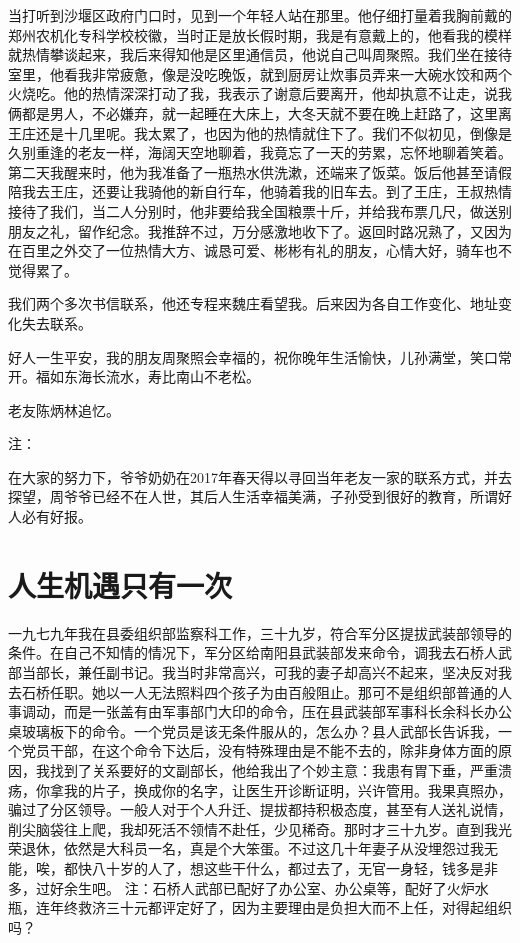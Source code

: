 当打听到沙堰区政府门口时，见到一个年轻人站在那里。他仔细打量着我胸前戴的郑州农机化专科学校校徽，当时正是放长假时期，我是有意戴上的，他看我的模样就热情攀谈起来，我后来得知他是区里通信员，他说自己叫周聚照。我们坐在接待室里，他看我非常疲惫，像是没吃晚饭，就到厨房让炊事员弄来一大碗水饺和两个火烧吃。他的热情深深打动了我，我表示了谢意后要离开，他却执意不让走，说我俩都是男人，不必嫌弃，就一起睡在大床上，大冬天就不要在晚上赶路了，这里离王庄还是十几里呢。我太累了，也因为他的热情就住下了。我们不似初见，倒像是久别重逢的老友一样，海阔天空地聊着，我竟忘了一天的劳累，忘怀地聊着笑着。第二天我醒来时，他为我准备了一瓶热水供洗漱，还端来了饭菜。饭后他甚至请假陪我去王庄，还要让我骑他的新自行车，他骑着我的旧车去。到了王庄，王叔热情接待了我们，当二人分别时，他非要给我全国粮票十斤，并给我布票几尺，做送别朋友之礼，留作纪念。我推辞不过，万分感激地收下了。返回时路况熟了，又因为在百里之外交了一位热情大方、诚恳可爱、彬彬有礼的朋友，心情大好，骑车也不觉得累了。

我们两个多次书信联系，他还专程来魏庄看望我。后来因为各自工作变化、地址变化失去联系。

好人一生平安，我的朋友周聚照会幸福的，祝你晚年生活愉快，儿孙满堂，笑口常开。福如东海长流水，寿比南山不老松。

老友陈炳林追忆。

注：

在大家的努力下，爷爷奶奶在2017年春天得以寻回当年老友一家的联系方式，并去探望，周爷爷已经不在人世，其后人生活幸福美满，子孙受到很好的教育，所谓好人必有好报。


\section*{人生机遇只有一次}

一九七九年我在县委组织部监察科工作，三十九岁，符合军分区提拔武装部领导的条件。在自己不知情的情况下，军分区给南阳县武装部发来命令，调我去石桥人武部当部长，兼任副书记。我当时非常高兴，可我的妻子却高兴不起来，坚决反对我去石桥任职。她以一人无法照料四个孩子为由百般阻止。那可不是组织部普通的人事调动，而是一张盖有由军事部门大印的命令，压在县武装部军事科长余科长办公桌玻璃板下的命令。一个党员是该无条件服从的，怎么办？县人武部长告诉我，一个党员干部，在这个命令下达后，没有特殊理由是不能不去的，除非身体方面的原因，我找到了关系要好的文副部长，他给我出了个妙主意：我患有胃下垂，严重溃疡，你拿我的片子，换成你的名字，让医生开诊断证明，兴许管用。我果真照办，骗过了分区领导。一般人对于个人升迁、提拔都持积极态度，甚至有人送礼说情，削尖脑袋往上爬，我却死活不领情不赴任，少见稀奇。那时才三十九岁。直到我光荣退休，依然是大科员一名，真是个大笨蛋。不过这几十年妻子从没埋怨过我无能，唉，都快八十岁的人了，想这些干什么，都过去了，无官一身轻，钱多是非多，过好余生吧。 注：石桥人武部已配好了办公室、办公桌等，配好了火炉水瓶，连年终救济三十元都评定好了，因为主要理由是负担大而不上任，对得起组织吗？


